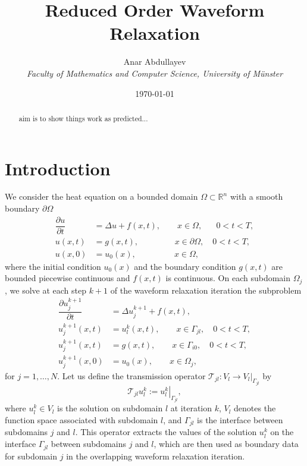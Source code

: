 \documentclass[a4paper, 11pt]{article}
\title{Reduced Order Waveform Relaxation}
\author{Anar Abdullayev\\[2ex]\textit{Faculty of Mathematics and Computer Science, University of Münster}}
\date{\today}
\theoremstyle{plain}
\theoremstyle{definition}
\theoremstyle{remark}
\begin{document}
\maketitle

\begin{abstract}
    aim is to show things work as predicted...
\end{abstract}

\section{Introduction}
We consider the heat equation on a bounded domain $\Omega\subset \mathbb{R}^{n}$ with a smooth boundary $\partial\Omega$
\begin{align*}
    \dfrac{\partial u}{\partial t} &= \Delta u + f(x, t), \qquad x\in \Omega, \,\,\,\,\quad 0<t<T,\\
    u(x, t) &= g(x, t), \hspace{52pt} x\in \partial\Omega, \quad 0<t<T,\\
    u(x, 0) &= u_{0}(x), \hspace{55pt} x\in \Omega,
\end{align*}
where the initial condition $u_{0}(x)$ and the boundary condition $g(x, t)$ are bounded piecewise continuous and $f(x, t)$ is continuous. On each subdomain $\Omega_{j}$, we solve at each step $k+1$ of the waveform relaxation iteration the subproblem
\begin{align*}
    \dfrac{\partial u_{j}^{k+1}}{\partial t} &= \Delta u_{j}^{k+1} + f(x, t),\\
    u_{j}^{k+1}(x, t) &= u_{l}^{k}(x, t), \qquad x\in \Gamma_{jl}, \quad 0<t<T,\\
    u_{j}^{k+1}(x, t) &= g(x, t), \qquad x\in \Gamma_{i0}, \quad 0<t<T,\\
    u_{j}^{k+1}(x, 0) &= u_{0}(x), \qquad x\in \Omega_{j},
\end{align*}
for $j=1, \ldots, N$. Let us define the transmission operator $\mathcal{T}_{jl}: V_l \to V_{l}|_{\Gamma_{jl}}$ by
\begin{equation*}
    \mathcal{T}_{jl}u_{l}^{k} := \left.u_{l}^{k}\right|_{\Gamma_{jl}},
\end{equation*}
where $u_{l}^k \in V_{l}$ is the solution on subdomain $l$ at iteration $k$, $V_{l}$ denotes the function space associated with subdomain $l$, and $\Gamma_{jl}$ is the interface between subdomains $j$ and $l$. This operator extracts the values of the solution $u_{l}^k$ on the interface $\Gamma_{jl}$ between subdomains $j$ and $l$, which are then used as boundary data for subdomain $j$ in the overlapping waveform relaxation iteration.
\end{document}
